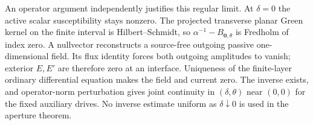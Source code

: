 \documentclass[11pt]{article}
\begin{document}
An operator argument independently justifies this regular limit. At $\delta=0$ the active scalar susceptibility stays nonzero. The projected transverse planar Green kernel on the finite interval is Hilbert--Schmidt, so $\alpha^{-1}-B_{\mathbf0,\theta}$ is Fredholm of index zero. A nullvector reconstructs a source-free outgoing passive one-dimensional field. Its flux identity forces both outgoing amplitudes to vanish; exterior $E,E'$ are therefore zero at an interface. Uniqueness of the finite-layer ordinary differential equation makes the field and current zero. The inverse exists, and operator-norm perturbation gives joint continuity in $(\delta,\theta)$ near $(0,0)$ for the fixed auxiliary drives. No inverse estimate uniform as $\delta\downarrow0$ is used in the aperture theorem.

\small


\end{document}
